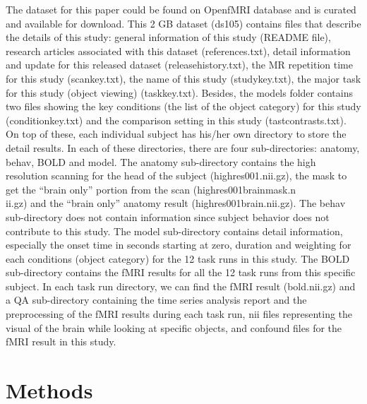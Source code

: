 \documentclass[11pt]{article}
\begin{document}
The dataset for this paper could be found on OpenfMRI database and is curated 
and available for download. This 2 GB dataset (ds105) contains files that 
describe the details of this study: general information of this study 
(README file), research articles associated with this dataset (references.txt), 
detail information and update for this released dataset 
(release\textunderscore history.txt), the MR repetition time for this study 
(scan\textunderscore key.txt), the name of this study 
(study\textunderscore key.txt), the major task for this study (object viewing) 
(task\textunderscore key.txt). Besides, the models folder contains two files 
showing the key conditions (the list of the object category) for this study 
(condition\textunderscore key.txt) and the comparison setting in this study 
(tast\textunderscore contrasts.txt). On top of these, each individual subject 
has his/her own directory to store the detail results. In each of these 
directories, there are four sub-directories: anatomy, behav, BOLD and model. 
The anatomy sub-directory contains the high resolution scanning for the head of 
the subject (highres001.nii.gz), the mask to get the ``brain only'' portion 
from the scan (highres001\textunderscore brain\textunderscore mask.n\\ii.gz) 
and the ``brain only'' anatomy result (highres001\textunderscore brain.nii.gz). 
The behav sub-directory does not contain information since subject behavior 
does not contribute to this study. The model sub-directory contains detail 
information, especially the onset time in seconds starting at zero, duration 
and weighting for each conditions (object category) for the 12 task runs in 
this study. The BOLD sub-directory contains the fMRI results for all the 12 
task runs from this specific subject. In each task run directory, we can find 
the fMRI result (bold.nii.gz) and a QA sub-directory containing the time series 
analysis report and the preprocessing of the fMRI results during each task run, 
nii files representing the visual of the brain while looking at specific 
objects, and confound files for the fMRI result in this study.\\ 

\section{Methods}
\end{document}

